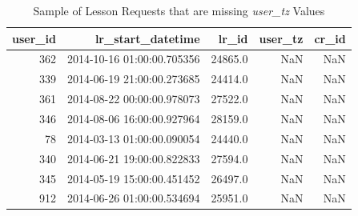 \documentclass[oneside]{article}
\begin{document}
\begin{table}[]
  \centering
  \caption{Sample of Lesson Requests that are missing \emph{user\_tz} Values}
  \label{tab:sample_lesson_request_missing_user_tz}
  \begin{tabular}{rrrrr}
    \hline
    \textbf{user\_id} & \textbf{lr\_start\_datetime} & \textbf{lr\_id} & \textbf{user\_tz} & \textbf{cr\_id} \\
    \hline
     362   & 2014-10-16 01:00:00.705356   & 24865.0    & NaN    &NaN \\
     339   & 2014-06-19 21:00:00.273685   & 24414.0    & NaN    &NaN \\
     361   & 2014-08-22 00:00:00.978073   & 27522.0    & NaN    &NaN \\
     346   & 2014-08-06 16:00:00.927964   & 28159.0    & NaN    &NaN \\
     78   & 2014-03-13 01:00:00.090054   & 24440.0    & NaN    &NaN \\
     340   & 2014-06-21 19:00:00.822833   & 27594.0    & NaN    &NaN \\
     345   & 2014-05-19 15:00:00.451452   & 26497.0    & NaN    &NaN \\
     912   & 2014-06-26 01:00:00.534694   & 25951.0    & NaN    &NaN \\
    \hline
  \end{tabular}
\end{table}
\end{document}
